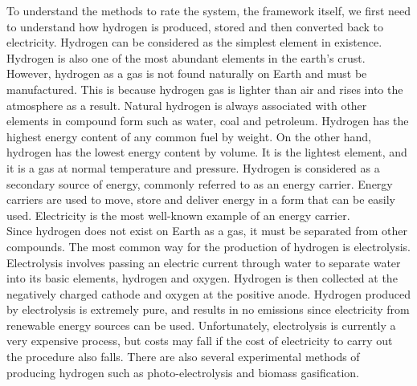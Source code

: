 \begin{parcolumns}[colwidths={1=2.5 cm, 2=10 cm, 3=2.5cm}]{3}
{To understand the methods to rate the system, the framework itself, we first need to understand how hydrogen is produced, stored and then converted back to electricity. Hydrogen can be considered as the simplest element in existence. Hydrogen is also one of the most abundant elements in the earth’s crust. However, hydrogen as a gas is not found naturally on Earth and must be manufactured. This is because hydrogen gas is lighter than air and rises into the atmosphere as a result. Natural hydrogen is always associated with other elements in compound form such as water, coal and petroleum. Hydrogen has the highest energy content of any common fuel by weight. On the other hand, hydrogen has the lowest energy content by volume. It is the lightest element, and it is a gas at normal temperature and pressure. Hydrogen is considered as a secondary source of energy, commonly referred to as an energy carrier. Energy carriers are used to move, store and deliver energy in a form that can be easily used. Electricity is the most well-known example of an energy carrier. \\

Since hydrogen does not exist on Earth as a gas, it must be separated from other compounds. The most common way for the production of hydrogen is electrolysis. Electrolysis involves passing an electric current through water to separate water into its basic elements, hydrogen and oxygen. Hydrogen is then collected at the negatively charged cathode and oxygen at the positive anode. Hydrogen produced by electrolysis is extremely pure, and results in no emissions since electricity from renewable energy sources can be used. Unfortunately, electrolysis is currently a very expensive process, but costs may fall if the cost of electricity to carry out the procedure also falls. There are also several experimental methods of producing hydrogen such as photo-electrolysis and biomass gasification. \\

}
\end{parcolumns}
